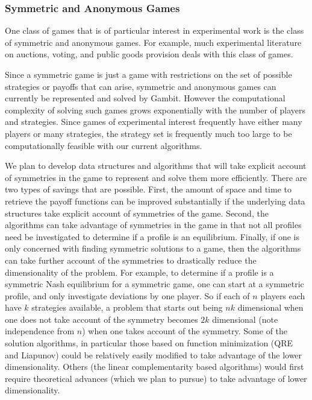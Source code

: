\documentclass[12pt]{article}
\begin{document}
\subsubsection{Symmetric and Anonymous Games}

One class of games that is of particular interest in experimental work
is the class of symmetric and anonymous games.  For example, much
experimental literature on auctions, voting, and public goods
provision deals with this class of games.

Since a symmetric game is just a game with restrictions on the set of
possible strategies or payoffs that can arise, symmetric and anonymous
games can currently be represented and solved by Gambit.  However the
computational complexity of solving such games grows exponentially
with the number of players and strategies.  Since games of
experimental interest frequently have either many players or many
strategies, the strategy set is frequently much too large to be
computationally feasible with our current algorithms.

We plan to develop data structures and algorithms that will take
explicit account of symmetries in the game to represent and solve them
more efficiently.  There are two types of savings that are possible.
First, the amount of space and time to retrieve the payoff functions
can be improved substantially if the underlying data structures take
explicit account of symmetries of the game.  Second, the algorithms
can take advantage of symmetries in the game in that not all profiles
need be investigated to determine if a profile is an equilibrium.
Finally, if one is only concerned with finding symmetric solutions to
a game, then the algorithms can take further account of the symmetries
to drastically reduce the dimensionality of the problem.  For example,
to determine if a profile is a symmetric Nash equilibrium for a
symmetric game, one can start at a symmetric profile, and only
investigate deviations by one player.  So if each of $n$ players each
have $k$ strategies available, a problem that starts out being $n k$
dimensional when one does not take account of the symmetry becomes
$2k$ dimensional (note independence from $n$) when one takes account
of the symmetry.  Some of the solution algorithms, in particular those
based on function minimization (QRE and Liapunov) could be relatively
easily modified to take advantage of the lower dimensionality.  Others
(the linear complementarity based algorithms) would first require
theoretical advances (which we plan to pursue) to take advantage of
lower dimensionality.
\end{document}
